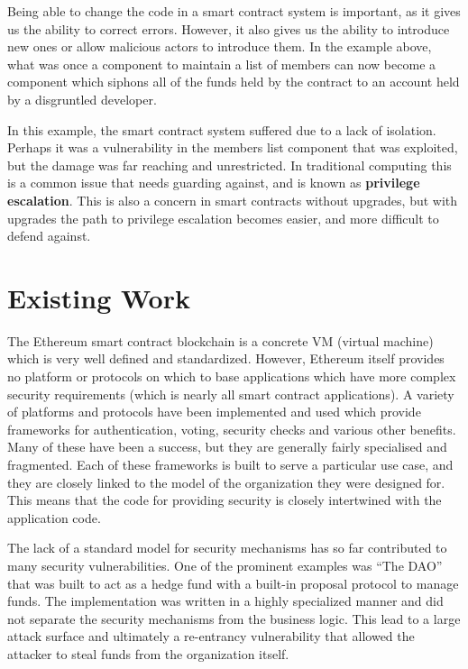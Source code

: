 \documentclass[english,a4paper]{article}
\begin{document}
Being able to change the code in a smart contract system is important, as it
gives us the ability to correct errors. However, it also gives us the ability
to introduce new ones or
allow malicious actors to introduce them. In the example above, what was
once a component to maintain a list of members can now become a component which
siphons all of the funds held by the contract to an account held by a
disgruntled developer.

In this example, the smart contract system suffered due to a lack of isolation.
Perhaps it was a vulnerability in the members list component that was exploited,
but the damage was far reaching and unrestricted. In traditional computing this
is a common issue that needs guarding against, and is known as \textbf{privilege
escalation}. This is also a concern in smart contracts without upgrades, but
with upgrades the path to privilege escalation becomes easier, and more
difficult to defend against.

\section{Existing Work}\label{existing-work}
The Ethereum smart contract blockchain is a concrete VM (virtual machine) which
is very well defined and standardized. However, Ethereum itself provides no
platform or protocols on which to base applications which have more complex
security requirements (which is nearly all smart contract applications). A
variety of platforms and protocols have been implemented and used which provide
frameworks for authentication, voting, security checks and various other
benefits. Many of these have been a success, but they are generally fairly
specialised and fragmented. Each of these frameworks is built to serve a
particular use case, and they are closely linked to the model
of the organization they were designed for. This means that the code for
providing security is closely intertwined with the application code.

The lack of a standard model for security mechanisms has so far contributed
to many
security vulnerabilities. One of the prominent examples was ``The DAO''
that was built to act as a hedge fund with a built-in proposal protocol
to manage funds. The implementation was written in a highly specialized
manner and did not separate the security mechanisms from the business
logic. This lead to a large attack surface and ultimately a re-entrancy
vulnerability that allowed the attacker to steal funds from the
organization itself.
\end{document}
